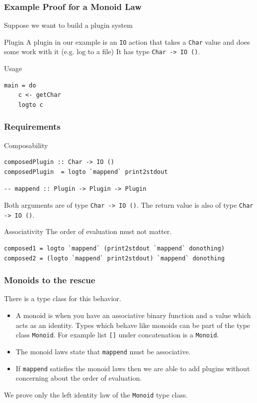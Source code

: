 \documentclass{beamer}
\begin{document}
\begin{frame}[fragile]
\frametitle{Example Proof for a Monoid Law}
  Suppose we want to build a plugin system

  \begin{block}{Plugin}
A plugin in our example is an \verb|IO| action that takes a \verb|Char| value and does some work with it (e.g. log to a file) It has type \verb|Char -> IO ()|.\end{block}

\begin{block}{Usage}
\begin{verbatim}
main = do
    c <- getChar
    logto c
\end{verbatim}
\end{block}
\end{frame}

\begin{frame}[fragile]
\frametitle{Requirements}
\begin{block}{Composability}
\begin{Verbatim}[fontsize=\footnotesize]
composedPlugin :: Char -> IO ()
composedPlugin  = logto `mappend` print2stdout
\end{Verbatim}

\begin{Verbatim}[fontsize=\footnotesize]
-- mappend :: Plugin -> Plugin -> Plugin
\end{Verbatim}

Both arguments are of type \verb|Char -> IO ()|. The return value is also of type \verb|Char -> IO ()|.
\end{block}
\begin{block}{Associativity}
The order of evaluation must not matter.
\begin{Verbatim}[fontsize=\footnotesize]
composed1 = logto `mappend` (print2stdout `mappend` donothing)
composed2 = (logto `mappend` print2stdout) `mappend` donothing
\end{Verbatim}
  
\end{block}
\end{frame}

\begin{frame}[fragile]
  \frametitle{Monoids to the rescue}

There is a type class for this behavior.

\begin{itemize}
\item A monoid is when you have an associative binary function and a value which acts as an identity. Types which behave like monoids can be part of the type class \verb|Monoid|. For example list \verb|[]| under concatenation is a \verb|Monoid|.
\item The monoid laws state that \verb|mappend| must be associative.
\item If \verb|mappend| satisfies the monoid laws then we are able to add plugins without concerning about the order of evaluation.
\end{itemize}
We prove only the left identity law of the \verb|Monoid| type class.
\end{frame}
\end{document}

